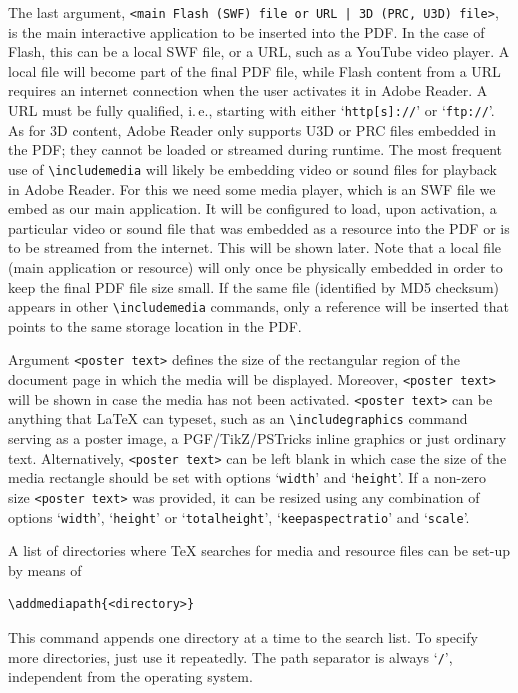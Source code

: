 \documentclass[a4paper]{article}
\begin{document}
The last argument, \verb+<main Flash (SWF) file or URL | 3D (PRC, U3D) file>+, is the main interactive application to be inserted into the PDF. In the case of Flash, this can be a local SWF file, or a URL, such as a YouTube video player. A local file will become part of the final PDF file, while Flash content from a URL requires an internet connection when the user activates it in Adobe Reader. A URL must be fully qualified, i.\,e., starting with either `\verb+http[s]://+' or `\verb+ftp://+'. As for 3D content, Adobe Reader only supports U3D or PRC files embedded in the PDF; they cannot be loaded or streamed during runtime. The most frequent use of \verb+\includemedia+ will likely be embedding video or sound files for playback in Adobe Reader. For this we need some media player, which is an SWF file we embed as our main application. It will be configured to load, upon activation, a particular video or sound file that was embedded as a resource into the PDF or is to be streamed from the internet. This will be shown later. Note that a local file (main application or resource) will only once be physically embedded in order to keep the final PDF file size small. If the same file (identified by MD5 checksum) appears in other \verb+\includemedia+ commands, only a reference will be inserted that points to the same storage location in the PDF.

Argument \verb+<poster text>+ defines the size of the rectangular region of the document page in which the media will be displayed. Moreover, \verb+<poster text>+ will be shown in case the media has not been activated.
\verb+<poster text>+ can be anything that \LaTeX{} can typeset, such as an \verb+\includegraphics+ command serving as a poster image, a PGF/TikZ/PSTricks inline graphics or just ordinary text. Alternatively, \verb+<poster text>+ can be left blank in which case the size of the media rectangle should be set with options `\verb+width+' and `\verb+height+'. If a non-zero size \verb+<poster text>+ was provided, it can be resized using any combination of options `\verb+width+', `\verb+height+' or `\verb+totalheight+', `\verb+keepaspectratio+' and `\verb+scale+'.

A list of directories where \TeX{} searches for media and resource files can be set-up by means of
\begin{verbatim}
\addmediapath{<directory>}
\end{verbatim}
This command appends one directory at a time to the search list. To specify more directories, just use it repeatedly. The path separator is always `\verb+/+', independent from the operating system.
\end{document}
